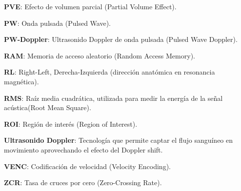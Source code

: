 {\textbf{PVE}: Efecto de volumen parcial (Partial Volume Effect).

\textbf{PW}: Onda pulsada (Pulsed Wave).

\textbf{PW-Doppler}: Ultrasonido Doppler de onda pulsada (Pulsed Wave Doppler).

\textbf{RAM}: Memoria de acceso aleatorio (Random Access Memory).

\textbf{RL}: Right-Left, Derecha-Izquierda (dirección anatómica en resonancia magnética).

\textbf{RMS}: Raíz media cuadrática, utilizada para medir la energía de la señal acústica(Root Mean Square).

\textbf{ROI}: Región de interés (Region of Interest).

\textbf{Ultrasonido Doppler}: Tecnología que permite captar el flujo sanguíneo en movimiento aprovechando el efecto del Doppler shift.

\textbf{VENC}: Codificación de velocidad (Velocity Encoding).

\textbf{ZCR}: Tasa de cruces por cero (Zero-Crossing Rate).
}